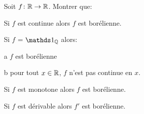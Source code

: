 \documentclass[french]{report}
\begin{document}
\begin{exo}
    Soit \(f\colon\mathbb{R}\to\mathbb{R}\). Montrer que:
    \begin{q}{1}
        Si \(f\) est continue alors \(f\) est borélienne.
    \end{q}
    \begin{q}{2}
        Si \(f\) = \(\ind_\Q\) alors:
        \begin{q}{a}
            \(f\) est borélienne
        \end{q}
        \begin{q}{b}
            pour tout \(x\in\mathbb{R}\), \(f\) n'est pas continue en \(x\).
        \end{q}
    \end{q}
    \begin{q}{3}
        Si \(f\) est monotone alors \(f\) est borélienne.
        \boxans{}
    \end{q}
    \begin{q}{4}
        Si \(f\) est dérivable alors \(f'\) est borélienne.
    \end{q}
\end{exo}
\end{document}
